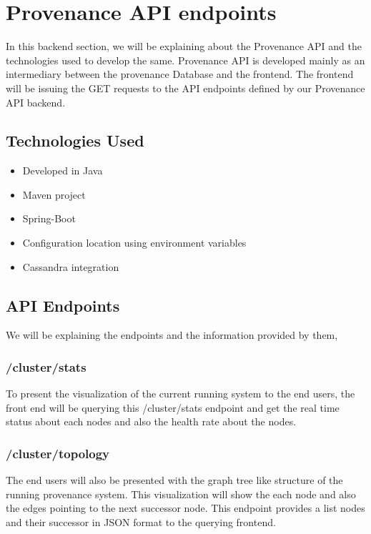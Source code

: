 \section{Provenance API endpoints}

In this backend section, we will be explaining about the Provenance API and the technologies used to develop the same. Provenance API is developed mainly as an intermediary between the provenance Database and the frontend.
The frontend will be issuing the GET requests to the API endpoints defined by our Provenance API backend.

\subsection{Technologies Used}

    \begin{itemize}
        \item Developed in Java
        \item Maven project
        \item Spring-Boot
        \item Configuration location using environment variables
        \item Cassandra integration
    \end{itemize}

\subsection{API Endpoints}

We will be explaining the endpoints and the information provided by them,

\subsubsection{/cluster/stats}

To present the visualization of the current running system to the end users, the front end will be querying this /cluster/stats endpoint and get the real time status about each nodes and also the health rate about the nodes. 

\subsubsection{/cluster/topology}

The end users will also be presented with the graph tree like structure of the running provenance system. This visualization will show the each node and also the edges pointing to the next successor node. This endpoint provides a list nodes and their successor in JSON format to the querying frontend. 

